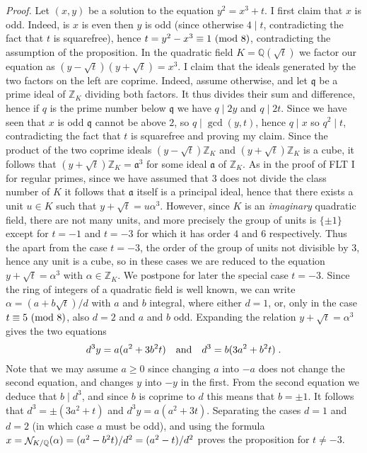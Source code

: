 \documentclass[12pt,a4paper]{article}
\DeclareMathOperator{\NO}{{\cal N}}
\DeclareMathOperator{\N}{{\NO\!}}
\newcommand{\Q}{{\mathbb Q}}
\newcommand{\Z}{{\mathbb Z}}
\renewcommand{\a}{{\mathfrak a}}
\newcommand{\al}{\alpha}
\newcommand{\q}{{\mathfrak q}}
\newcommand{\Proof}{{\it Proof. \/}}
\renewcommand{\pmod}[1]{\allowbreak\ ({\rm{mod}}\,\,#1)}
\begin{document}
\Proof Let $(x,y)$ be a solution to the equation $y^2=x^3+t$. I first
claim that $x$ is odd. Indeed, is $x$ is even then $y$ is odd (since otherwise
$4\mid t$, contradicting the fact that $t$ is squarefree), hence
$t=y^2-x^3\equiv1\pmod{8}$, contradicting the assumption of the proposition.
In the quadratic field $K=\Q(\sqrt{t})$ we factor our equation as
$(y-\sqrt{t})(y+\sqrt{t})=x^3$. I claim that the ideals generated by the two 
factors on the left are coprime. Indeed, assume otherwise, and let $\q$ be a 
prime ideal of $\Z_K$ dividing both factors. It thus divides their sum and 
difference, hence if $q$ is the prime number below $\q$ we have $q\mid 2y$ 
and $q\mid 2t$. Since we have seen that $x$ is odd $\q$ cannot be above $2$, 
so $q\mid\gcd(y,t)$, hence $q\mid x$ so $q^2\mid t$, contradicting the fact 
that $t$ is squarefree and proving my claim. Since the product of the two 
coprime ideals $(y-\sqrt{t})\Z_K$ and $(y+\sqrt{t})\Z_K$ is a cube, it follows
that $(y+\sqrt{t})\Z_K=\a^3$ for some ideal $\a$ of $\Z_K$. As in the proof
of FLT I for regular primes, since we have assumed that $3$ does not divide
the class number of $K$ it follows that $\a$ itself is a principal ideal,
hence that there exists a unit $u\in K$ such that $y+\sqrt{t}=u\al^3$. 
However, since $K$ is an \emph{imaginary} quadratic field, there are not many 
units, and more precisely the group of units is $\{\pm1\}$ except for $t=-1$ 
and $t=-3$ for which it has order $4$ and $6$ respectively. Thus the apart
from the case $t=-3$, the order of the group of units not divisible by $3$,
hence any unit is a cube, so in these cases we are reduced to the equation 
$y+\sqrt{t}=\al^3$ with $\al\in\Z_K$. We postpone for later the special
case $t=-3$. Since the ring of integers of a quadratic field is well known,
we can write $\al=(a+b\sqrt{t})/d$ with $a$ and $b$ integral, where 
either $d=1$, or, only in the case $t\equiv5\pmod8$, also $d=2$ and $a$ and $b$
odd. Expanding the relation $y+\sqrt{t}=\al^3$ gives the two equations
$$d^3y=a(a^2+3b^2t)\text{\quad and\quad}d^3=b(3a^2+b^2t)\;.$$
Note that we may assume $a\ge0$ since changing $a$ into $-a$ does not change
the second equation, and changes $y$ into $-y$ in the first. From the second 
equation we deduce that $b\mid d^3$, and since $b$ is coprime
to $d$ this means that $b=\pm1$. It follows that $d^3=\pm(3a^2+t)$
and $d^3y=a(a^2+3t)$. Separating the cases $d=1$ and $d=2$ (in which case
$a$ must be odd), and using the formula 
$x=\N_{K/\Q}(\al)=(a^2-b^2t)/d^2=(a^2-t)/d^2$ proves the proposition for
$t\ne-3$.
\end{document}
